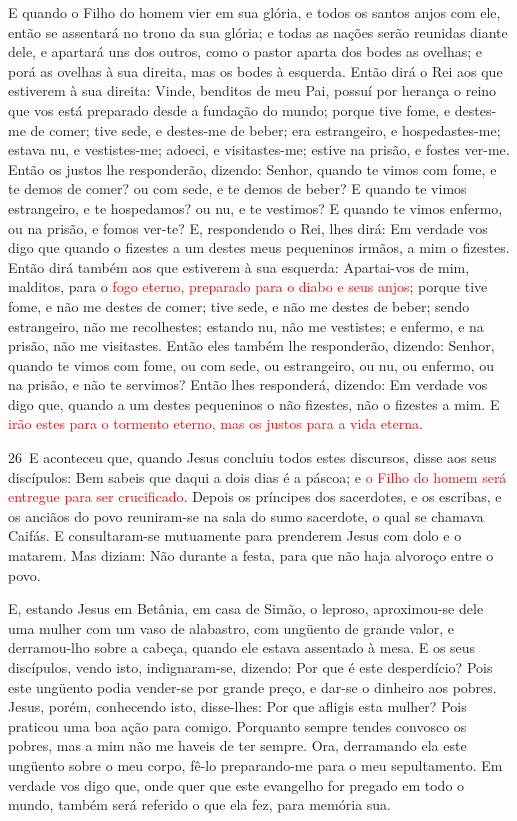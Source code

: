 E quando o Filho do homem vier em sua glória, e todos os santos
anjos com ele, então se assentará no trono da sua glória; e
todas as nações serão reunidas diante dele, e apartará uns dos
outros, como o pastor aparta dos bodes as ovelhas; e porá as
ovelhas à sua direita, mas os bodes à esquerda. Então dirá o
Rei aos que estiverem à sua direita: Vinde, benditos de meu Pai,
possuí por herança o reino que vos está preparado desde a fundação
do mundo; porque tive fome, e destes-me de comer; tive sede,
e destes-me de beber; era estrangeiro, e hospedastes-me;
estava nu, e vestistes-me; adoeci, e visitastes-me; estive na
prisão, e fostes ver-me. Então os justos lhe responderão,
dizendo: Senhor, quando te vimos com fome, e te demos de comer? ou
com sede, e te demos de beber? E quando te vimos estrangeiro,
e te hospedamos? ou nu, e te vestimos? E quando te vimos
enfermo, ou na prisão, e fomos ver-te? E, respondendo o Rei,
lhes dirá: Em verdade vos digo que quando o fizestes a um destes
meus pequeninos irmãos, a mim o fizestes. Então dirá também
aos que estiverem à sua esquerda: Apartai-vos de mim, malditos, para
o \textcolor{red}{fogo eterno, preparado para o diabo e seus anjos};
porque tive fome, e não me destes de comer; tive sede, e não
me destes de beber; sendo estrangeiro, não me recolhestes;
estando nu, não me vestistes; e enfermo, e na prisão, não me
visitastes. Então eles também lhe responderão, dizendo:
Senhor, quando te vimos com fome, ou com sede, ou estrangeiro, ou
nu, ou enfermo, ou na prisão, e não te servimos? Então lhes
responderá, dizendo: Em verdade vos digo que, quando a um destes
pequeninos o não fizestes, não o fizestes a mim. E
\textcolor{red}{irão estes para o tormento eterno, mas os justos para a vida
eterna}.

\medskip

\lettrine{26}\ E aconteceu que, quando Jesus concluiu todos
estes discursos, disse aos seus discípulos: Bem sabeis que daqui
a dois dias é a páscoa; e \textcolor{red}{o Filho do homem será entregue
para ser crucificado}. Depois os príncipes dos sacerdotes, e os
escribas, e os anciãos do povo reuniram-se na sala do sumo
sacerdote, o qual se chamava Caifás. E consultaram-se mutuamente
para prenderem Jesus com dolo e o matarem. Mas diziam: Não
durante a festa, para que não haja alvoroço entre o povo.

E, estando Jesus em Betânia, em casa de Simão, o leproso,
aproximou-se dele uma mulher com um vaso de alabastro, com
ungüento de grande valor, e derramou-lho sobre a cabeça, quando ele
estava assentado à mesa. E os seus discípulos, vendo isto,
indignaram-se, dizendo: Por que é este desperdício? Pois este
ungüento podia vender-se por grande preço, e dar-se o dinheiro aos
pobres. Jesus, porém, conhecendo isto, disse-lhes: Por que
afligis esta mulher? Pois praticou uma boa ação para comigo.
Porquanto sempre tendes convosco os pobres, mas a mim não me
haveis de ter sempre. Ora, derramando ela este ungüento sobre
o meu corpo, fê-lo preparando-me para o meu sepultamento. Em
verdade vos digo que, onde quer que este evangelho for pregado em
todo o mundo, também será referido o que ela fez, para memória sua.

